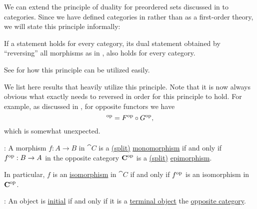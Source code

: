 \begin{proposition}\label{thm:categorical_principle_of_duality}
  We can extend the principle of duality for preordered sets discussed in  to categories. Since we have defined categories in \hyperref[def:axiom_of_universes]{} rather than as a first-order theory, we will state this principle informally:
  \begin{displayquote}
    If a statement holds for every category, its dual statement obtained by \enquote{reversing} all morphisms as in , also holds for every category.
  \end{displayquote}

  See  for how this principle can be utilized easily.

  We list here results that heavily utilize this principle. Note that it is now always obvious what exactly needs to reversed in order for this principle to hold. For example, as discussed in , for opposite functors we have
  \begin{equation*}
    [F \bincirc G]^{\opcat} = F^{\opcat} \bincirc G^{\opcat},
  \end{equation*}
  which is somewhat unexpected.

  \begin{thmenum}
     : A morphism \( f: A \to B \) in \( \cat{C} \) is a \hyperref[def:morphism_invertibility/left_invertible]{(split)} \hyperref[def:morphism_invertibility/left_cancellative]{monomorphism} if and only if \( f^{\operatorname{op}}: B \to A \) in the opposite category \( \operatorname{\mathbf{C}}^{\operatorname{op}} \) is a \hyperref[def:morphism_invertibility/right_invertible]{(split)} \hyperref[def:morphism_invertibility/right_cancellative]{epimorphism}.

    In particular, \( f \) is an \hyperref[def:morphism_invertibility/isomorphism]{isomorphism} in \( \cat{C} \) if and only if \( f^{\operatorname{op}} \) is an isomorphism in \( \operatorname{\mathbf{C}}^{\operatorname{op}} \).

     : An object is \hyperref[def:universal_objects/initial]{initial} if and only if it is a \hyperref[def:universal_objects/terminal]{terminal object} the \hyperref[def:opposite_category]{opposite category}.


\end{thmenum}
\end{proposition}
